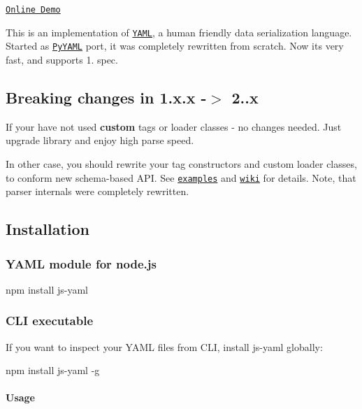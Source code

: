 \href{http://travis-ci.org/nodeca/js-yaml}{\tt }

\href{http://nodeca.github.com/js-yaml/}{\tt Online Demo}

This is an implementation of \href{http://yaml.org/}{\tt Y\+A\+ML}, a human friendly data serialization language. Started as \href{http://pyyaml.org/}{\tt Py\+Y\+A\+ML} port, it was completely rewritten from scratch. Now it\textquotesingle{}s very fast, and supports 1. spec.

\subsection*{Breaking changes in 1.\+x.\+x -\/$>$ 2..\+x }

If your have not used {\bfseries custom} tags or loader classes -\/ no changes needed. Just upgrade library and enjoy high parse speed.

In other case, you should rewrite your tag constructors and custom loader classes, to conform new schema-\/based A\+PI. See \href{https://github.com/nodeca/js-yaml/tree/master/examples}{\tt examples} and \href{https://github.com/nodeca/js-yaml/wiki}{\tt wiki} for details. Note, that parser internals were completely rewritten.

\subsection*{Installation }

\subsubsection*{Y\+A\+ML module for node.\+js}


\begin{DoxyCode}
npm install js-yaml
\end{DoxyCode}


\subsubsection*{C\+LI executable}

If you want to inspect your Y\+A\+ML files from C\+LI, install js-\/yaml globally\+:


\begin{DoxyCode}
npm install js-yaml -g
\end{DoxyCode}


\paragraph*{Usage}


